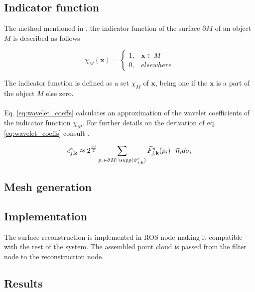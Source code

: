\subsection{Indicator function}
The method mentioned in \cite{Manson2008}, the indicator function of the surface $\partial M$ of an object $M$ is described as follows

\begin{equation}
	\chi_M(\textbf{x}) = 
	\begin{cases}
	1, & \textbf{x} \in M\\
	0, & elsewhere
	\end{cases} 
	\label{eq:indicator_fnc}
\end{equation}

The indicator function is defined as a set $\chi_M$ of $\textbf{x}$, being one if the $\textbf{x}$ is a part of the object $M$ else zero.\\
\\
Eq. \ref{eq:wavelet_coeffs} calculates an approximation of the wavelet coefficients of the indicator function $\chi_M$. For further details on the derivation of eq. \ref{eq:wavelet_coeffs} consult \cite{Manson2008}. 

\begin{equation}
	c^e_{j,\textbf{k}} \approx 2^{3j \over 2} \sum_{p_i \in \partial M \cap \textit{supp}(\psi^e_{j,\textbf{k}})} \vec{F}^e_{j,\textbf{k}} (p_i) \cdot \vec{n}_i d \sigma_i 
	\label{eq:wavelet_coeffs}
\end{equation}



\subsection{Mesh generation}

\subsection{Implementation}
The surface reconstruction is implemented in ROS node making it compatible with the rest of the system. The assembled point cloud is passed from the filter node to the reconstruction node.

\subsection{Results}